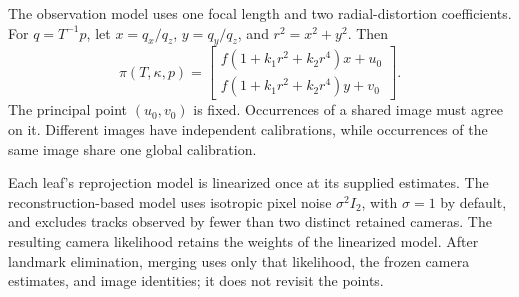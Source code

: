 \documentclass[11pt,letterpaper]{article}
\begin{document}
The observation model uses one focal length and two radial-distortion coefficients.
For $q=T^{-1}p$, let $x=q_x/q_z$, $y=q_y/q_z$, and $r^2=x^2+y^2$. Then
\begin{equation}
 \pi(T,\kappa,p)=
 \begin{bmatrix} f(1+k_1r^2+k_2r^4)x+u_0\\
                 f(1+k_1r^2+k_2r^4)y+v_0\end{bmatrix}.
\end{equation}
The principal point $(u_0,v_0)$ is fixed. Occurrences of a shared image must agree
on it. Different images have independent calibrations, while occurrences of the
same image share one global calibration.

Each leaf's reprojection model is linearized once at its supplied estimates.
The reconstruction-based model uses isotropic pixel noise $\sigma^2 I_2$,
with $\sigma=1$ by default, and excludes tracks observed by fewer than two distinct
retained cameras. The resulting camera likelihood retains the weights of the
linearized model. After landmark elimination, merging uses only that likelihood,
the frozen camera estimates, and image identities; it does not revisit the points.

\newpage
\end{document}
